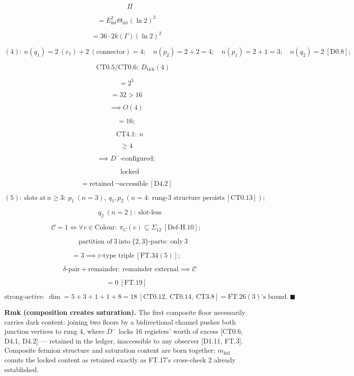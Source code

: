 \begin{theorem}
\[
\quad\Pi
\]

\[
= E_{\mathrm{int}}^2\Theta_{\mathrm{int}}(\ln2)^2
\]

\[
= 36\cdot2k(\Gamma)(\ln2)^2
\]

\[
(4):\ n(q_1)=2\ (c_1)+2\ (\text{connector})=4;\quad n(p_2)=2+2=4;\quad n(p_1)=2+1=3;\quad n(q_2)=2\ [\mathrm{D0.8}];
\]

\[
\qquad \mathrm{CT0.5}/\mathrm{CT0.6}:\ D_{\mathrm{tick}}(4)
\]

\[
= 2^5
\]

\[
= 32>16
\]

\[
\implies O(4)
\]

\[
= 16;
\]

\[
\quad\mathrm{CT4.1}:\ n
\]

\[
\ge 4
\]

\[
\implies D^-\text{-configured};
\]

\[
\quad\text{locked}
\]

\[
= \text{retained}\ \neg\text{accessible}\ [\mathrm{D4.2}]
\]

\[
(5):\ \text{slots at}\ n\ge3:\ p_1\ (n{=}3),\ q_1,p_2\ (n{=}4:\ \text{rung-3 structure persists}\ [\mathrm{CT0.13}]);
\]

\[
\quad q_2\ (n{=}2):\ \text{slot-less}
\]

\[
\mathcal C=1\iff\forall v\in\mathrm{Colour}:\ \pi_C(v)\subseteq\Sigma_{12}\ [\mathrm{Def\text{-}H.10}];
\]

\[
\qquad \text{partition of}\ 3\ \text{into}\ \{2,3\}\text{-parts}:\ \text{only}\ 3
\]

\[
= 3\implies\varepsilon\text{-type triple}\ [\mathrm{FT.34}(5)];
\]

\[
\quad\delta\text{-pair}+\text{remainder}:\ \text{remainder external}\implies\mathcal C
\]

\[
= 0\ [\mathrm{FT.19}]
\]

\[
\text{strong-active}:\ \dim=5{+}3{+}1{+}1{+}8=18\ [\mathrm{CT0.12},\ \mathrm{CT0.14},\ \mathrm{CT3.8}]=\mathrm{FT.26}(3)\text{'s bound}.\ \blacksquare
\]

\textbf{Rmk (composition creates saturation).} The first composite floor necessarily carries dark content: joining two floors by a bidirectional channel pushes both junction vertices to rung 4, where $D^-$ locks 16 registers' worth of excess [CT0.6, D4.1, D4.2] — retained in the ledger, inaccessible to any observer [D1.11, FT.3]. Composite fermion structure and saturation content are born together; $m_{\mathrm{hid}}$ counts the locked content as retained exactly as FT.17's cross-check 2 already established.


\end{theorem}
